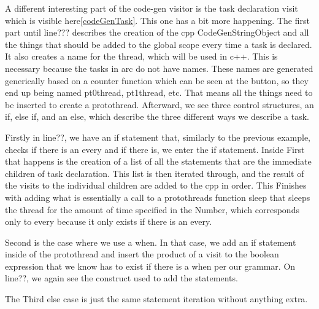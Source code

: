 A different interesting part of the code-gen visitor is the task declaration visit which is visible here\ref{codeGenTask}. 
This one has a bit more happening. The first part until line??? describes the creation of the cpp CodeGenStringObject and all the things that should be added to the global scope every time a task is declared. It also creates a name for the thread, which will be used in c++. This is necessary because the tasks in arc do not have names. These names are generated generically based on a counter function which can be seen at the button, so they end up being named pt0thread, pt1thread, etc.
That means all the things need to be inserted to create a protothread. Afterward, we see three control structures, an if, else if, and an else, which describe the three different ways we describe a task.

Firstly in line??, we have an if statement that, similarly to the previous example, checks if there is an every and if there is, we enter the if statement. Inside First that happens is the creation of a list of all the statements that are the immediate children of task declaration. This list is then iterated through, and the result of the visits to the individual children are added to the cpp in order. This Finishes with adding what is essentially a call to a protothreads function sleep that sleeps the thread for the amount of time specified in the Number, which corresponds only to every because it only exists if there is an every.

Second is the case where we use a when. In that case, we add an if statement inside of the protothread and insert the product of a visit to the boolean expression that we know has to exist if there is a when per our grammar. On line??, we again see the construct used to add the statements.  

The Third else case is just the same statement iteration without anything extra. 


